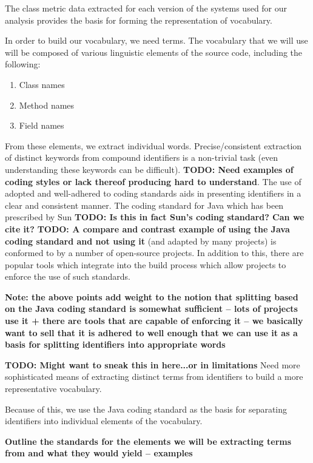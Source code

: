 The class metric data extracted for each version of the systems used for our analysis provides the basis for forming the representation of vocabulary.

In order to build our vocabulary, we need terms. The vocabulary that we will use will be composed of various linguistic elements of the source code, including the following:

\begin{enumerate}
	\item Class names
	\item Method names
	\item Field names
\end{enumerate}

From these elements, we extract individual words. Precise/consistent extraction of distinct keywords from compound identifiers is a non-trivial task (even understanding these keywords can be difficult). \textbf{TODO: Need examples of coding styles or lack thereof producing hard to understand}. The use of adopted and well-adhered to coding standards aids in presenting identifiers in a clear and consistent manner. The coding standard for Java which has been prescribed by Sun \textbf{TODO: Is this in fact Sun's coding standard? Can we cite it?} \textbf{TODO: A compare and contrast example of using the Java coding standard and not using it} (and adapted by many projects) is conformed to by a number of open-source projects.
In addition to this, there are popular tools which integrate into the build process which allow projects to enforce the use of such standards.

\textbf{Note: the above points add weight to the notion that splitting based on the Java coding standard is somewhat sufficient -- lots of projects use it + there are tools that are capable of enforcing it -- we basically want to sell that it is adhered to well enough that we can use it as a basis for splitting identifiers into appropriate words}

\textbf{TODO: Might want to sneak this in here...or in limitations}
Need more sophisticated means of extracting distinct terms from identifiers to build a more representative vocabulary.

Because of this, we use the Java coding standard as the basis for separating identifiers into individual elements of the vocabulary.

\textbf{Outline the standards for the elements we will be extracting terms from and what they would yield -- examples}

